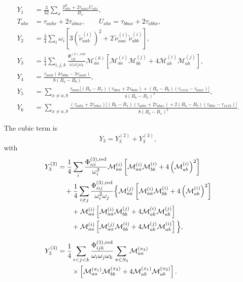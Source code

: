 \begin{widetext}
\begin{align}
Y_1 &=
\frac{3}{32}\sum_x
\frac{T_{abx}^2+2\tau_{aaax}U_{abx}}{B_x},
\\
T_{abx} &= \tau_{aabx}+2\tau_{abax},
\qquad
U_{abx} = \tau_{bbax}+2\tau_{abbx},
\\[6pt]
Y_2 &=
\frac{3}{4}\sum_i \omega_i
\left[
3\left(\widetilde{\nu}^{(i)}_{aab}\right)^2
+2\,\widetilde{\nu}^{(i)}_{aaa}\widetilde{\nu}^{(i)}_{abb}
\right],
\\[6pt]
Y_3 &=
\frac{1}{4}\sum_{i,j,k}
\frac{\Phi^{(3),\mathrm{red}}_{ijk}}{\omega_i\omega_j\omega_k}
\mathcal{M}^{(k)}_{aa}
\left[
\mathcal{M}^{(i)}_{aa}\mathcal{M}^{(j)}_{bb}
+4\mathcal{M}^{(i)}_{ab}\mathcal{M}^{(j)}_{ab}
\right],
\\[6pt]
Y_4 &=
\frac{\tau_{aaab}\left(4\tau_{bbba}-3\tau_{aaab}\right)}
{8(B_a-B_b)},
\\[6pt]
Y_5
&=
\sum_{x\neq a,b}
\frac{
\tau_{aaax}
\Big[
(B_a-B_x)(\tau_{bbax}+2\tau_{babx})
+(B_a-B_b)(\tau_{xxxa}-\tau_{aaax})
\Big]}
{4(B_a-B_x)^2},
\\[6pt]
Y_6
&=
\sum_{x\neq a,b}
\frac{
(\tau_{aabx}+2\tau_{abax})
\Big[
(B_b-B_x)(\tau_{aabx}+2\tau_{abax})
+2(B_a-B_b)(\tau_{bbbx}-\tau_{xxxb})
\Big]}
{8(B_b-B_x)^2}.
\end{align}
\end{widetext}

The cubic term is
\begin{equation}
Y_3=Y_3^{(2)}+Y_3^{(3)},
\end{equation}
with
\begin{align}
Y_3^{(2)}
&=
\frac{1}{4}\sum_i
\frac{\Phi^{(3),\mathrm{red}}_{iii}}{\omega_i^3}
\mathcal{M}^{(i)}_{aa}
\left[
\mathcal{M}^{(i)}_{aa}\mathcal{M}^{(i)}_{bb}
+4\left(\mathcal{M}^{(i)}_{ab}\right)^2
\right]
\notag\\
&\quad
+\frac{1}{4}\sum_{i\neq j}
\frac{\Phi^{(3),\mathrm{red}}_{iij}}{\omega_i^2\omega_j}
\Big\{
\mathcal{M}^{(j)}_{aa}
\left[
\mathcal{M}^{(i)}_{aa}\mathcal{M}^{(i)}_{bb}
+4\left(\mathcal{M}^{(i)}_{ab}\right)^2
\right]
\notag\\
&\qquad
+\mathcal{M}^{(i)}_{aa}
\left[
\mathcal{M}^{(i)}_{aa}\mathcal{M}^{(j)}_{bb}
+4\mathcal{M}^{(i)}_{ab}\mathcal{M}^{(j)}_{ab}
\right]
\notag\\
&\qquad
+\mathcal{M}^{(i)}_{aa}
\left[
\mathcal{M}^{(j)}_{aa}\mathcal{M}^{(i)}_{bb}
+4\mathcal{M}^{(j)}_{ab}\mathcal{M}^{(i)}_{ab}
\right]
\Big\},
\\[6pt]
Y_3^{(3)}
&=
\frac{1}{4}\sum_{i<j<k}
\frac{\Phi^{(3),\mathrm{red}}_{ijk}}{\omega_i\omega_j\omega_k}
\sum_{\pi\in S_3}
\mathcal{M}^{(\pi_3)}_{aa}
\notag\\
&\qquad \times
\left[
\mathcal{M}^{(\pi_1)}_{aa}\mathcal{M}^{(\pi_2)}_{bb}
+4\mathcal{M}^{(\pi_1)}_{ab}\mathcal{M}^{(\pi_2)}_{ab}
\right].
\end{align}

